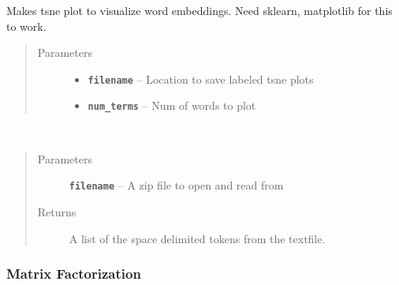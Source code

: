 \documentclass[letterpaper,10pt,english]{sphinxmanual}
\begin{document}

\begin{fulllineitems}
\label{models:skipgram.plot_tsne}
Makes tsne plot to visualize word embeddings. Need sklearn, matplotlib for this to work.
\begin{quote}\begin{description}
\item[{Parameters}] \leavevmode\begin{itemize}
\item {} 
\textbf{\texttt{filename}} -- Location to save labeled tsne plots

\item {} 
\textbf{\texttt{num\_terms}} -- Num of words to plot

\end{itemize}

\end{description}\end{quote}

\end{fulllineitems}


\begin{fulllineitems}
\label{models:skipgram.read_data}~\begin{quote}\begin{description}
\item[{Parameters}] \leavevmode
\textbf{\texttt{filename}} -- A zip file to open and read from

\item[{Returns}] \leavevmode
A list of the space delimited tokens from the textfile.

\end{description}\end{quote}

\end{fulllineitems}



\subsubsection{Matrix Factorization}
\label{models:module-mfmodel}\label{models:matrix-factorization}
\end{document}
